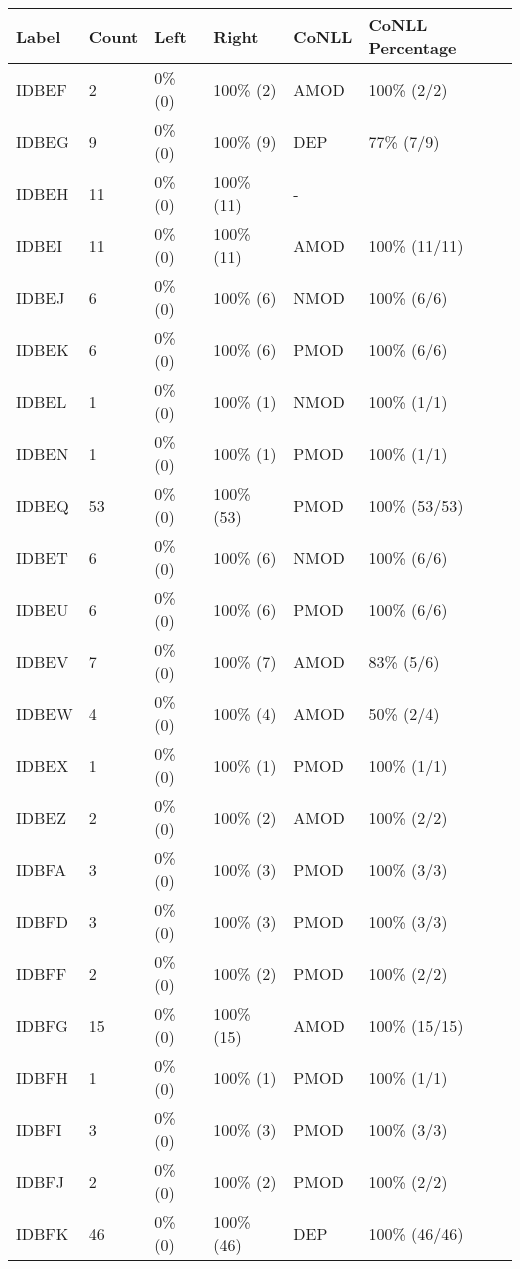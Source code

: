 \begin{figure*}
\begin{tabular}{|l|l|l|l||l|l|}
\hline
Label & Count & Left & Right & CoNLL & CoNLL Percentage\\ 
\hline
 IDBEF & 2 & 0\% (0) & 100\% (2) & AMOD & 100\% (2/2) \\ 
\hline
 IDBEG & 9 & 0\% (0) & 100\% (9) & DEP & 77\% (7/9) \\ 
\hline
 IDBEH & 11 & 0\% (0) & 100\% (11) & - &  \\ 
\hline
 IDBEI & 11 & 0\% (0) & 100\% (11) & AMOD & 100\% (11/11) \\ 
\hline
 IDBEJ & 6 & 0\% (0) & 100\% (6) & NMOD & 100\% (6/6) \\ 
\hline
 IDBEK & 6 & 0\% (0) & 100\% (6) & PMOD & 100\% (6/6) \\ 
\hline
 IDBEL & 1 & 0\% (0) & 100\% (1) & NMOD & 100\% (1/1) \\ 
\hline
 IDBEN & 1 & 0\% (0) & 100\% (1) & PMOD & 100\% (1/1) \\ 
\hline
 IDBEQ & 53 & 0\% (0) & 100\% (53) & PMOD & 100\% (53/53) \\ 
\hline
 IDBET & 6 & 0\% (0) & 100\% (6) & NMOD & 100\% (6/6) \\ 
\hline
 IDBEU & 6 & 0\% (0) & 100\% (6) & PMOD & 100\% (6/6) \\ 
\hline
 IDBEV & 7 & 0\% (0) & 100\% (7) & AMOD & 83\% (5/6) \\ 
\hline
 IDBEW & 4 & 0\% (0) & 100\% (4) & AMOD & 50\% (2/4) \\ 
\hline
 IDBEX & 1 & 0\% (0) & 100\% (1) & PMOD & 100\% (1/1) \\ 
\hline
 IDBEZ & 2 & 0\% (0) & 100\% (2) & AMOD & 100\% (2/2) \\ 
\hline
 IDBFA & 3 & 0\% (0) & 100\% (3) & PMOD & 100\% (3/3) \\ 
\hline
 IDBFD & 3 & 0\% (0) & 100\% (3) & PMOD & 100\% (3/3) \\ 
\hline
 IDBFF & 2 & 0\% (0) & 100\% (2) & PMOD & 100\% (2/2) \\ 
\hline
 IDBFG & 15 & 0\% (0) & 100\% (15) & AMOD & 100\% (15/15) \\ 
\hline
 IDBFH & 1 & 0\% (0) & 100\% (1) & PMOD & 100\% (1/1) \\ 
\hline
 IDBFI & 3 & 0\% (0) & 100\% (3) & PMOD & 100\% (3/3) \\ 
\hline
 IDBFJ & 2 & 0\% (0) & 100\% (2) & PMOD & 100\% (2/2) \\ 
\hline
 IDBFK & 46 & 0\% (0) & 100\% (46) & DEP & 100\% (46/46) \\ 

\end{tabular}
\end{figure*}
